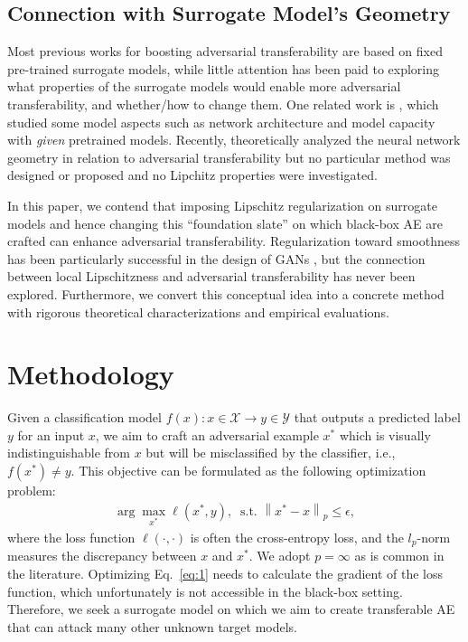 \documentclass[letterpaper]{article} %
\theoremstyle{plain}
\theoremstyle{definition}
\begin{document}
\subsection{Connection with Surrogate Model's Geometry}
Most previous works for boosting adversarial transferability are based on fixed pre-trained surrogate models, while little attention has been paid to exploring what properties of the surrogate models would enable more adversarial transferability, and whether/how to change them. One related work is \cite{wu2018understanding}, which studied some model aspects such as network architecture and model capacity with {\em given} pretrained models. Recently, \cite{charles2019geometric,tramer2017space} theoretically analyzed the neural network geometry in relation to adversarial transferability but no particular method was designed or proposed and no Lipchitz properties were investigated.

In this paper, we contend that imposing Lipschitz regularization on surrogate models and hence changing this ``foundation slate'' on which black-box AE are crafted can enhance adversarial transferability. Regularization toward smoothness has been particularly successful in the design of GANs \cite{gulrajani2017improved}, but the connection between local Lipschitzness and adversarial transferability has never been explored. Furthermore, we convert this conceptual idea into a concrete method with rigorous theoretical characterizations and empirical evaluations.

\section{Methodology} \label{sec:methodology}

Given a classification model $f(x): x \in \mathcal{X} \rightarrow y \in \mathcal{Y}$ that outputs a predicted label $y$ for an input $x$, we aim to craft an adversarial example $x^*$ which is visually indistinguishable from $x$ but will be misclassified by the classifier, i.e., $f\left(x^*\right) \neq y$. This objective can be formulated as the following optimization problem:
\begin{align} \label{eq:1}
    \arg \max _{x^*} \ell\left(x^*, y\right), \;\; \text {s.t. }\left\|x^*-x\right\|_p \leq \epsilon,
\end{align}
where the loss function $\ell(\cdot, \cdot)$ is often the cross-entropy loss, and the $l_p$-norm measures the discrepancy between $x$ and $x^*$. We adopt $p=\infty$ as is common in the literature. Optimizing Eq.~\eqref{eq:1} needs to calculate the gradient of the loss function, which unfortunately is not accessible in the black-box setting. Therefore, we seek a surrogate model on which we aim to create transferable AE that can attack many other unknown target models.
\end{document}
